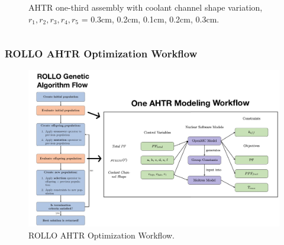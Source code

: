\begin{frame}
\begin{columns}
\begin{column}{0.5\textwidth}
\begin{figure}
                \caption{AHTR one-third assembly with coolant channel shape variation, 
                $r_1, r_2, r_3, r_4, r_5$ = 0.3cm, 0.2cm, 0.1cm, 0.2cm, 0.3cm.}
            \end{figure}
        \end{column}
        \end{columns}
\end{frame}

\begin{frame}
    \frametitle{ROLLO AHTR Optimization Workflow}
    \begin{figure}
        \includegraphics[width=0.9\linewidth]{figures/ahtr-modeling-workflow.png} 
        \caption{ROLLO AHTR Optimization Workflow.}
    \end{figure}
\end{frame}

